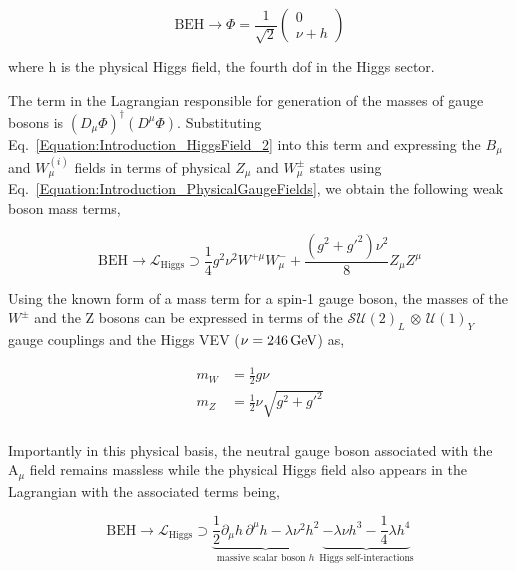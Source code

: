 \begin{equation}
    \text{BEH} \rightarrow \Phi = \frac{1}{\sqrt{2}}\begin{pmatrix}
        0 \\
        \nu + h
    \end{pmatrix} 
    \label{Equation:Introduction_HiggsField_2}
\end{equation}

where h is the physical Higgs field, the fourth dof in the Higgs sector.

The term in the Lagrangian responsible for generation of the masses of gauge bosons is $(D_\mu\Phi)^\dagger(D^\mu\Phi)$. Substituting Eq.~\ref{Equation:Introduction_HiggsField_2} into this term and expressing the $B_\mu$ and $W_{\mu}^{(i)}$ fields in terms of physical $Z_\mu$ and $W_{\mu}^{\pm}$ states using Eq.~\ref{Equation:Introduction_PhysicalGaugeFields}, we obtain the following weak boson mass terms,

\begin{equation}
    \text{BEH} \rightarrow \mathcal{L}_{\text{Higgs}} \supset \frac{1}{4} g^2 \nu^2 W^{+\mu}W_{\mu}^- + \frac{(g^2+g'^2)\nu^2}{8} Z_\mu Z^\mu
\label{Equation:Introduction_HiggsLagrangian_2}
\end{equation}

Using the known form of a mass term for a spin-1 gauge boson, the masses of the $W^\pm$ and the Z bosons can be expressed in terms of the $\mathcal{SU}(2)_{L}$ $\otimes$ $\mathcal{U}(1)_{Y}$ gauge couplings and the Higgs VEV ($\nu = 246 \,\text{Ge\hspace{-.08em}V}$) as,

\begin{equation}
\begin{aligned}
    m_W &= \frac{1}{2}g\nu \\
    m_Z &= \frac{1}{2}\nu\sqrt{g^2+g'^2}\\
\end{aligned}
\end{equation}

Importantly in this physical basis, the neutral gauge boson associated with the $\text{A}_\mu$ field remains massless while the physical Higgs field also appears in the Lagrangian with the associated terms being,

\begin{equation}
    \text{BEH} \rightarrow \mathcal{L}_{\text{Higgs}} \supset \underbrace{\frac{1}{2} \partial_\mu h \, \partial^\mu h - \lambda \nu^2 h^2}_{\text{massive scalar boson } h}
    \underbrace{- \lambda \nu h^3 - \frac{1}{4} \lambda h^4}_{\text{Higgs self-interactions}}
\label{Equation:Introduction_HiggsLagrangian_3}
\end{equation}

